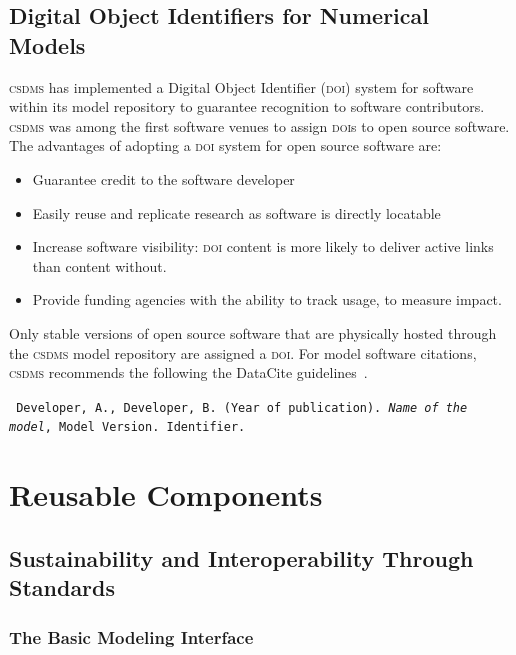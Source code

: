 \documentclass[11pt, oneside]{amsart}
\DeclareRobustCommand{\csdms}{\textsc{csdms}}
\DeclareRobustCommand{\doi}{\textsc{doi}}
\begin{document}
\subsection{Digital Object Identifiers for Numerical Models}
\label{sec:doi}

\csdms{} has implemented a
Digital Object Identifier (\doi{}) system for software within its model
repository to guarantee recognition to software contributors.
\csdms{} was among the first software venues to assign \doi{}s to
open source software. The advantages of adopting a \doi{} system for open
source software are: 
\begin{itemize}
\item Guarantee credit to the software developer
\item Easily reuse and replicate research as software is directly locatable 
\item Increase software visibility: \doi{} content is more likely to
      deliver active links than content without.
\item Provide funding agencies with the ability to track usage, to measure
      impact.
\end{itemize}

Only stable versions of open source
software that are physically hosted through the \csdms{} model repository are
assigned a \doi{}. For model software citations, \csdms{} recommends the
following the DataCite guidelines~\cite{brase2009datacite}.

\begin{shaded}
\leftskip 0.25in
\parindent -0.25in
\tt{
Developer, A., Developer, B. (Year of publication). \emph{Name of the model},
Model Version. Identifier.
}
\end{shaded}

\section{Reusable Components}
\label{sec:reusable}

\subsection{Sustainability and Interoperability Through Standards}
\label{sec:standards}

\subsubsection{The Basic Modeling Interface}
\label{sec:bmi}
\end{document}
